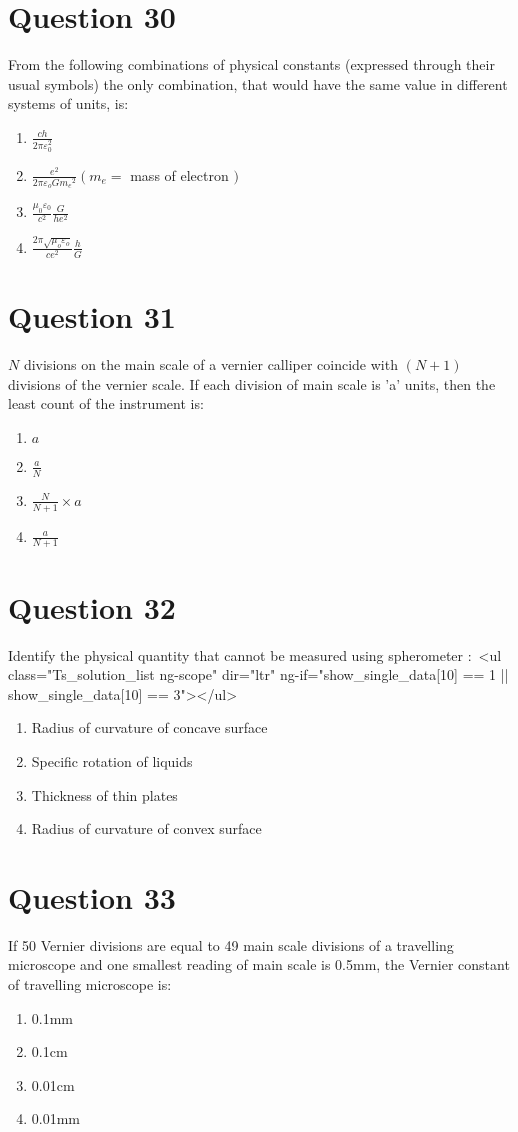 \documentclass{article}
\begin{document}
\section*{Question 30}
From the following combinations of physical constants (expressed through their usual symbols) the only combination, that would have the same value in different systems of units, is: 
\begin{enumerate}[label=(\alph*)]
\item \(\frac{c h}{2 \pi \varepsilon_0^2}\)
\item \(\frac{e^2}{2 \pi \varepsilon_o G m_e{ }^2}\left(m_e=\right.\) mass of electron \()\)
\item \(\frac{\mu_0 \varepsilon_0}{c^2} \frac{G}{h e^2}\)
\item \(\frac{2 \pi \sqrt{\mu_o \varepsilon_o}}{c e^2} \frac{h}{G}\)
\end{enumerate}
\newpage
\section*{Question 31}
\(N\) divisions on the main scale of a vernier calliper coincide with \((N+1)\) divisions of the vernier scale. If each division of main scale is 'a' units, then the least count of the instrument is: 
\begin{enumerate}[label=(\alph*)]
\item \(a\)
\item \(\frac{a}{N}\)
\item \(\frac{N}{N+1} \times a\)
\item \(\frac{a}{N+1}\)
\end{enumerate}
\newpage
\section*{Question 32}
Identify the physical quantity that cannot be measured using spherometer : <ul class="Ts_solution_list ng-scope" dir="ltr" ng-if="show_single_data[10] == 1 || show_single_data[10] == 3"></ul>
\begin{enumerate}[label=(\alph*)]
\item Radius of curvature of concave surface
\item Specific rotation of liquids
\item Thickness of thin plates
\item Radius of curvature of convex surface
\end{enumerate}
\newpage
\section*{Question 33}
If 50 Vernier divisions are equal to 49 main scale divisions of a travelling microscope and one smallest reading of main scale is 0.5mm, the Vernier constant of travelling microscope is: 
\begin{enumerate}[label=(\alph*)]
\item 0.1mm
\item 0.1cm
\item 0.01cm
\item 0.01mm
\end{enumerate}
\newpage
\end{document}
